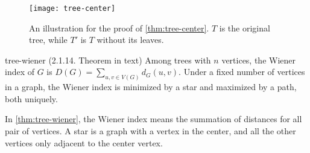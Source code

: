 \documentclass[../src/handouts/main.tex]{subfiles}
\begin{document}
\begin{figure}[htbp]
  \centering
  \texttt{[image: tree-center]}
  \caption{An illustration for the proof of \cref{thm:tree-center}. $T$ is the original tree, while $T'$ is $T$ without its leaves.}
  \label{fig:tree-center}
\end{figure}

\begin{theorem}{}{tree-wiener}
  (2.1.14. Theorem in text)
  Among trees with $n$ vertices, the Wiener index of $G$ is $D(G)=\sum_{u, v \in V(G)} d_G(u, v)$. Under a fixed number of vertices in a graph, the Wiener index is minimized by a star and maximized by a path, both uniquely.
\end{theorem}

In \cref{thm:tree-wiener}, the Wiener index means the summation of distances for all pair of vertices. A star is a graph with a vertex in the center, and all the other vertices only adjacent to the center vertex.
\end{document}
